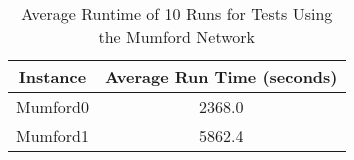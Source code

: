 \begin{table}[H]
    \centering
    \hspace*{-1.0cm}
    \begin{tabular}{|c|c|}
        \hline
        Instance & Average Run Time (seconds) \\
        \hline
        Mumford0 & 2368.0\\
        \hline
        Mumford1 & 5862.4\\
        \hline
    \end{tabular}
    \caption{Average Runtime of 10 Runs for Tests Using the Mumford Network}
    \label{tabel:runTimeMandl}
\end{table}







